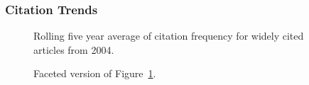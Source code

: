 \documentclass[
  10pt,
  letterpaper,
  DIV=11,
  numbers=noendperiod,
  twoside]{scrartcl}
\begin{document}
\subsubsection*{Citation Trends}\label{sec-trends-2004}

\begin{figure}


\caption{\label{fig-citation-spaghetti-2004}Rolling five year average of
citation frequency for widely cited articles from 2004.}

\end{figure}%

\begin{figure}


\caption{\label{fig-citation-facet-2004}Faceted version of
Figure~\ref{fig-citation-spaghetti-2004}.}

\end{figure}%
\end{document}
